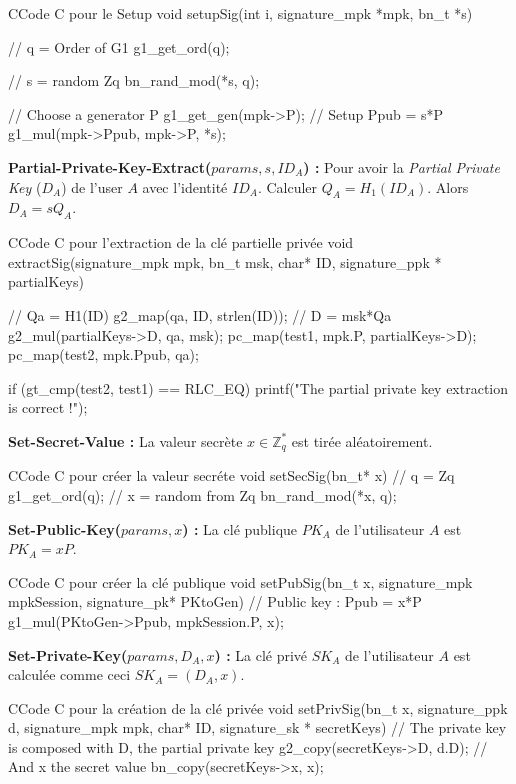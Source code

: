 \begin{sourcebox}{C}{Code C pour le Setup}
	void setupSig(int i, signature_mpk *mpk, bn_t *s){
		// q = Order of G1
		g1_get_ord(q);
		
		// s = random Zq
		bn_rand_mod(*s, q);
		
		// Choose a generator P
		g1_get_gen(mpk->P);
		// Setup Ppub = s*P
		g1_mul(mpk->Ppub, mpk->P, *s);
	}
\end{sourcebox}

\textbf{Partial-Private-Key-Extract($params, s, ID_A$) :} Pour avoir la \textit{Partial Private Key} ($D_A$) de l'user $A$ avec l'identité $ID_A$. Calculer $Q_A = H_1(ID_A)$. Alors $D_A = sQ_A$.

\begin{sourcebox}{C}{Code C pour l'extraction de la clé partielle privée}
	void extractSig(signature_mpk mpk, bn_t msk, char* ID, signature_ppk * partialKeys) {
		// Qa = H1(ID)
		g2_map(qa, ID, strlen(ID));
		// D = msk*Qa
		g2_mul(partialKeys->D, qa, msk);
		pc_map(test1, mpk.P, partialKeys->D);
		pc_map(test2, mpk.Ppub, qa);
		
		if (gt_cmp(test2, test1) == RLC_EQ) {
			printf("The partial private key extraction is correct !\n");
		}
	}
\end{sourcebox}

\textbf{Set-Secret-Value :} La valeur secrète $x \in \mathbb{Z}_q^*$ est tirée aléatoirement.

\begin{sourcebox}{C}{Code C pour créer la valeur secréte}
	void setSecSig(bn_t* x){
		// q = Zq
		g1_get_ord(q);
		// x = random from Zq
		bn_rand_mod(*x, q);
	}
\end{sourcebox}

\textbf{Set-Public-Key($params, x$) :}  La clé publique $PK_A$ de l'utilisateur $A$ est $PK_A = xP$.

\begin{sourcebox}{C}{Code C pour créer la clé publique}
	void setPubSig(bn_t x, signature_mpk mpkSession, signature_pk* PKtoGen){
		// Public key : Ppub = x*P
		g1_mul(PKtoGen->Ppub, mpkSession.P, x);
	}
\end{sourcebox}

\textbf{Set-Private-Key($params, D_A, x$) :} La clé privé $SK_A$ de l'utilisateur $A$ est calculée comme ceci $SK_A = (D_A, x)$.

\begin{sourcebox}{C}{Code C pour la création de la clé privée}
	void setPrivSig(bn_t x, signature_ppk d, signature_mpk mpk, char* ID, signature_sk * secretKeys){
		// The private key is composed with D, the partial private key
		g2_copy(secretKeys->D, d.D);
		// And x the secret value
		bn_copy(secretKeys->x, x);
	}
\end{sourcebox}

